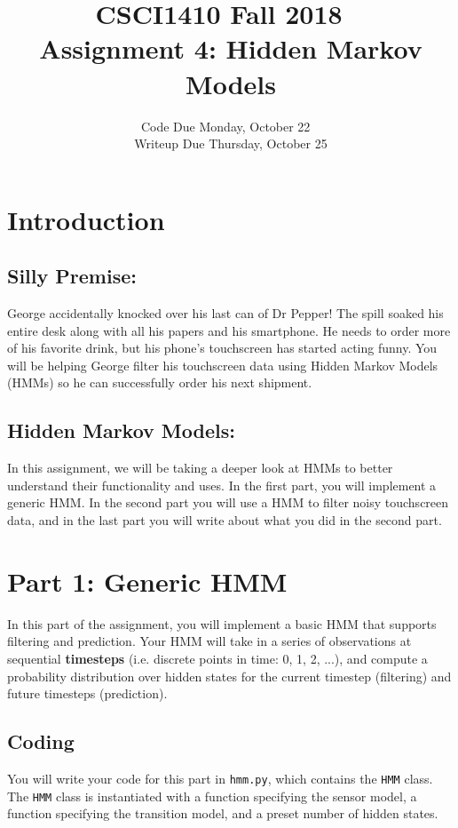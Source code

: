 \documentclass{article}
\title{CSCI1410 Fall 2018 ~\\
Assignment 4: Hidden Markov Models}
\date{Code Due Monday, October 22 ~\\
Writeup Due Thursday, October 25}
\begin{document}
    \maketitle

    \section*{Introduction}
    \subsection*{Silly Premise:}

    George accidentally knocked over his last can of Dr Pepper! The spill soaked his entire desk along with all his papers and his smartphone. He needs to order more of his favorite drink, but his phone's touchscreen has started acting funny. You will be helping George filter his touchscreen data using Hidden Markov Models (HMMs) so he can successfully order his next shipment.

    \subsection*{Hidden Markov Models:}
    In this assignment, we will be taking a deeper look at HMMs to better understand their functionality and uses. In the first part, you will implement a generic HMM. In the second part you will use a HMM to filter noisy touchscreen data, and in the last part you will write about what you did in the second part.

    \section{Part 1: Generic HMM}
    In this part of the assignment, you will implement a basic HMM that supports filtering and prediction.
    Your HMM will take in a series of observations at sequential \textbf{timesteps} (i.e. discrete points in time: 0, 1, 2, ...), and compute a probability distribution over hidden states for the current timestep (filtering) and future timesteps (prediction).

    \subsection{Coding}
    You will write your code for this part in \verb|hmm.py|, which contains the \verb|HMM| class.
    The \verb|HMM| class is instantiated with a function specifying the sensor model, a function specifying the transition model, and a preset number of hidden states. \\
\end{document}
